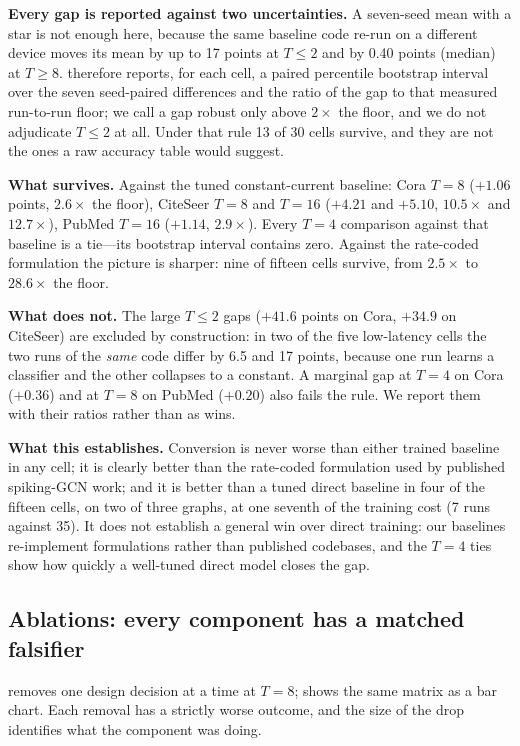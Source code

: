 \textbf{Every gap is reported against two uncertainties.} A seven-seed mean with a star is not enough
here, because the same baseline code re-run on a different device moves its mean by up to 17 points
at $T \le 2$ and by 0.40 points (median) at $T \ge 8$.  therefore reports, for
each cell, a paired percentile bootstrap interval over the seven seed-paired differences and the
ratio of the gap to that measured run-to-run floor; we call a gap robust only above
$2\times$ the floor, and we do not adjudicate $T \le 2$ at all. Under that rule 13 of 30 cells
survive, and they are not the ones a raw accuracy table would suggest.

\textbf{What survives.} Against the tuned constant-current baseline: Cora $T=8$ ($+1.06$ points,
$2.6\times$ the floor), CiteSeer $T=8$ and $T=16$ ($+4.21$ and $+5.10$, $10.5\times$ and
$12.7\times$), PubMed $T=16$ ($+1.14$, $2.9\times$). Every $T=4$ comparison against that baseline is
a tie---its bootstrap interval contains zero. Against the rate-coded formulation the picture is
sharper: nine of fifteen cells survive, from $2.5\times$ to $28.6\times$ the floor.

\textbf{What does not.} The large $T \le 2$ gaps ($+41.6$ points on Cora, $+34.9$ on CiteSeer) are
excluded by construction: in two of the five low-latency cells the two runs of the \emph{same} code
differ by 6.5 and 17 points, because one run learns a classifier and the other collapses to a
constant. A marginal gap at $T=4$ on Cora ($+0.36$) and at $T=8$ on PubMed ($+0.20$) also fails the
rule. We report them with their ratios rather than as wins.

\textbf{What this establishes.} Conversion is never worse than either trained baseline in any cell;
it is clearly better than the rate-coded formulation used by published spiking-GCN work; and it is
better than a tuned direct baseline in four of the fifteen cells, on two of three graphs, at one
seventh of the training cost (7 runs against 35). It does not establish a general win over direct
training: our baselines re-implement formulations rather than published codebases, and the $T=4$
ties show how quickly a well-tuned direct model closes the gap.

\subsection{Ablations: every component has a matched falsifier}
\label{sec:ablate}

 removes one design decision at a time at $T=8$;  shows the
same matrix as a bar chart. Each removal has a strictly worse outcome, and the size of the drop
identifies what the component was doing.


